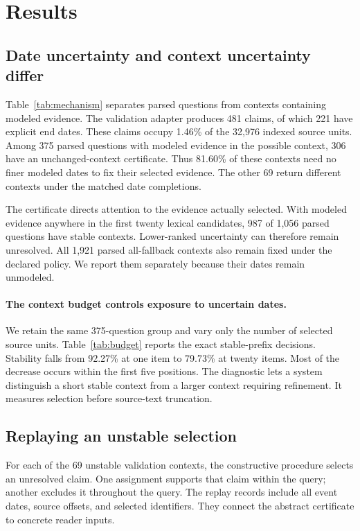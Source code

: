 \section{Results}
\label{sec:results}

\subsection{Date uncertainty and context uncertainty differ}

Table~\ref{tab:mechanism} separates parsed questions from contexts containing modeled evidence.
The validation adapter produces 481 claims, of which 221 have explicit end dates.
These claims occupy 1.46\% of the 32,976 indexed source units.
Among 375 parsed questions with modeled evidence in the possible context, 306 have an unchanged-context certificate.
Thus 81.60\% of these contexts need no finer modeled dates to fix their selected evidence.
The other 69 return different contexts under the matched date completions.


The certificate directs attention to the evidence actually selected.
With modeled evidence anywhere in the first twenty lexical candidates, 987 of 1,056 parsed questions have stable contexts.
Lower-ranked uncertainty can therefore remain unresolved.
All 1,921 parsed all-fallback contexts also remain fixed under the declared policy.
We report them separately because their dates remain unmodeled.

\paragraph{The context budget controls exposure to uncertain dates.}
We retain the same 375-question group and vary only the number of selected source units.
Table~\ref{tab:budget} reports the exact stable-prefix decisions.
Stability falls from 92.27\% at one item to 79.73\% at twenty items.
Most of the decrease occurs within the first five positions.
The diagnostic lets a system distinguish a short stable context from a larger context requiring refinement.
It measures selection before source-text truncation.


\subsection{Replaying an unstable selection}

For each of the 69 unstable validation contexts, the constructive procedure selects an unresolved claim.
One assignment supports that claim within the query; another excludes it throughout the query.
The replay records include all event dates, source offsets, and selected identifiers.
They connect the abstract certificate to concrete reader inputs.


